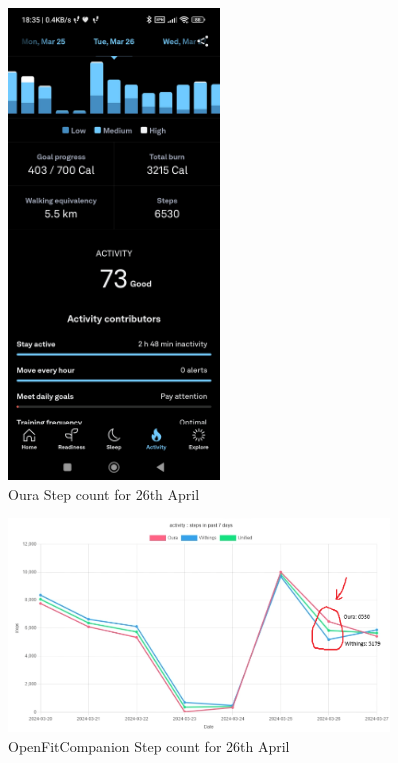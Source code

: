 \begin{figure}
    
    \centering
    \includegraphics[width=0.5\textwidth,keepaspectratio]{../images/OuraActivity.jpg}
    \caption{Oura Step count for 26th April}
    \label{fig:ouraSteps}
    
\end{figure}
\begin{figure}
    
    \centering
    \includegraphics[width=0.9\textwidth,keepaspectratio]{../images/dashboard.png}
    \caption{OpenFitCompanion Step count for 26th April}
    \label{fig:openFitCompanionSteps}
    
\end{figure}

